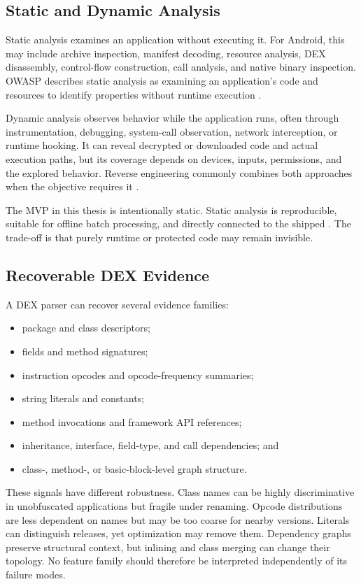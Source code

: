 \subsection{Static and Dynamic Analysis}

Static analysis examines an application without executing it. For Android,
this may include archive inspection, manifest decoding, resource analysis,
DEX disassembly, control-flow construction, call analysis, and native binary
inspection. OWASP describes static analysis as examining an application's
code and resources to identify properties without runtime execution
\cite{owaspStaticAnalysis}.

Dynamic analysis observes behavior while the application runs, often through
instrumentation, debugging, system-call observation, network interception, or
runtime hooking. It can reveal decrypted or downloaded code and actual
execution paths, but its coverage depends on devices, inputs, permissions, and
the explored behavior. Reverse engineering commonly combines both approaches
when the objective requires it \cite{owaspReverseEngineering}.

The MVP in this thesis is intentionally static. Static analysis is
reproducible, suitable for offline batch processing, and directly connected
to the shipped \APK. The trade-off is that purely runtime or protected code
may remain invisible.

\subsection{Recoverable DEX Evidence}

A DEX parser can recover several evidence families:

\begin{itemize}
  \item package and class descriptors;
  \item fields and method signatures;
  \item instruction opcodes and opcode-frequency summaries;
  \item string literals and constants;
  \item method invocations and framework API references;
  \item inheritance, interface, field-type, and call dependencies; and
  \item class-, method-, or basic-block-level graph structure.
\end{itemize}

These signals have different robustness. Class names can be highly
discriminative in unobfuscated applications but fragile under renaming.
Opcode distributions are less dependent on names but may be too coarse for
nearby versions. Literals can distinguish releases, yet optimization may
remove them. Dependency graphs preserve structural context, but inlining and
class merging can change their topology. No feature family should therefore
be interpreted independently of its failure modes.

